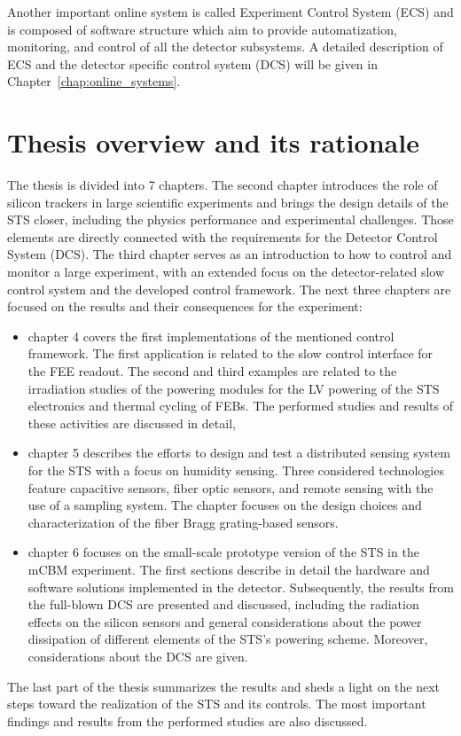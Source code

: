 Another important online system is called Experiment Control System (\gls{ECS}) and is composed of software structure which aim to provide automatization, monitoring, and control of all the detector subsystems. A detailed description of \gls{ECS} and the detector specific control system (\gls{DCS}) will be given in Chapter~\ref{chap:online_systems}.



\section{Thesis overview and its rationale}
The thesis is divided into 7 chapters. The second chapter introduces the role of silicon trackers in large scientific experiments and brings the design details of the \gls{STS} closer, including the physics performance and experimental challenges. Those elements are directly connected with the requirements for the Detector Control System (\gls{DCS}). The third chapter serves as an introduction to how to control and monitor a large experiment, with an extended focus on the detector-related slow control system and the developed control framework. The next three chapters are focused on the results and their consequences for the experiment:
\begin{itemize}
    \item chapter 4 covers the first implementations of the mentioned control framework. The first application is related to the slow control interface for the \gls{FEE} readout. The second and third examples are related to the irradiation studies of the powering modules for the \gls{LV} powering of the \gls{STS} electronics and thermal cycling of \glspl{FEB}. The performed studies and results of these activities are discussed in detail,
    \item chapter 5 describes the efforts to design and test a distributed sensing system for the \gls{STS} with a focus on humidity sensing. Three considered technologies feature capacitive sensors, fiber optic sensors, and remote sensing with the use of a sampling system. The chapter focuses on the design choices and characterization of the fiber Bragg grating-based sensors. 
    \item chapter 6 focuses on the small-scale prototype version of the \gls{STS} in the \gls{mCBM} experiment. The first sections describe in detail the hardware and software solutions implemented in the detector. Subsequently, the results from the full-blown \gls{DCS} are presented and discussed, including the radiation effects on the silicon sensors and general considerations about the power dissipation of different elements of the \gls{STS}'s powering scheme. Moreover, considerations about the \gls{DCS} are given. 
\end{itemize}
The last part of the thesis summarizes the results and sheds a light on the next steps toward the realization of the \gls{STS} and its controls. The most important findings and results from the performed studies are also discussed.
